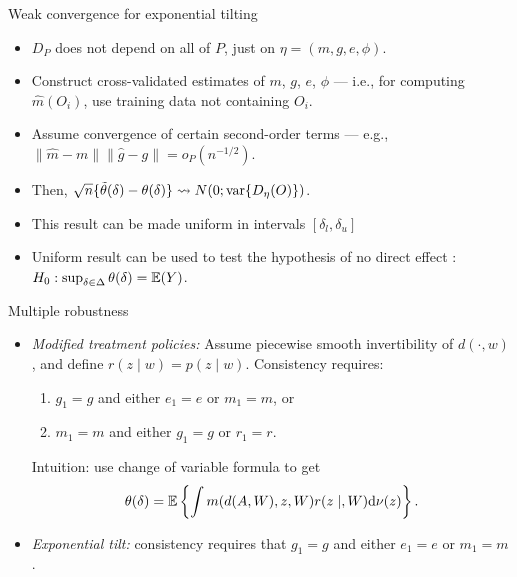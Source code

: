 \documentclass{beamer}
\begin{document}

\begin{frame}{Weak convergence for exponential tilting}
  \begin{itemize}
    \item $D_P$ does not depend on all of $P$, just on $\eta=(m,g,e,\phi)$.
    \item Construct cross-validated estimates of $m$, $g$, $e$, $\phi$ ---
      i.e., for computing $\hat m(O_i)$, use training data not containing $O_i$.
  \item Assume convergence of certain second-order terms --- e.g.,
    $\lVert \hat{m} - m\rVert \lVert\hat{g} - g\rVert = o_P(n^{-1/2})$.
  \item Then,
        $\sqrt{n}\{\tilde \theta(\delta) - \theta(\delta)\} \rightsquigarrow
          N(0;\operatorname{var}\{D_{\eta} (O)\})$.
   \item This result can be made uniform in intervals $[\delta_l,\delta_u]$
  \item Uniform result can be used to test the hypothesis of no
    direct effect \citep{kennedy2017nonparametric}:
    $H_0 : \sup_{\delta \in \Delta} \theta(\delta) = \mathbb{E}(Y)$.
  \end{itemize}

\note{
}

\end{frame}


\begin{frame}{Multiple robustness}
  \begin{itemize}
  \item \textit{Modified treatment policies:} Assume piecewise smooth
    invertibility of $d(\cdot, w)$, and define $r(z\mid w) = p(z\mid w)$.
    Consistency requires:
    \begin{enumerate}
      \item $g_1=g$ and either $e_1=e$ or $m_1=m$, or
      \item $m_1=m$ and either $g_1=g$ or $r_1=r$.
    \end{enumerate}
    Intuition: use change of variable formula to get
    \[\theta(\delta) = \mathbb{E}\left\{\int m(d(A,W),z,W)r(z \mid,
        W)\mathrm{d}\nu(z)\right\}.\]
  \item \textit{Exponential tilt:} consistency requires that $g_1 = g$ and
     either $e_1 = e$ or $m_1 = m$.
  \end{itemize}

\note{
}

\end{frame}
\end{document}
